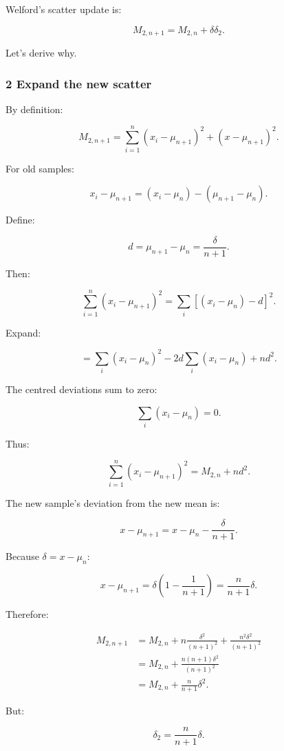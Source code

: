 Welford's scatter update is:

\[
 \boxed{ M_{2,n+1} = M_{2,n}+\delta\delta_2 }.
\]

Let's derive why.

\subsubsection{2 Expand the new scatter}\label{02-foundations-ii-ch030-expand-the-new-scatter}

\hypertarget{02-foundations-ii-ch030-expand-the-new-scatter}{}

By definition:

\[
 M_{2,n+1} = \sum_{i=1}^{n}(x_i-\mu_{n+1})^2 + (x-\mu_{n+1})^2.
\]

For old samples:

\[
 x_i-\mu_{n+1} = (x_i-\mu_n)-(\mu_{n+1}-\mu_n).
\]

Define:

\[
 d=\mu_{n+1}-\mu_n=\frac{\delta}{n+1}.
\]

Then:

\[
 \sum_{i=1}^{n}(x_i-\mu_{n+1})^2 = \sum_i[(x_i-\mu_n)-d]^2.
\]

Expand:

\[
 = \sum_i(x_i-\mu_n)^2 - 2d\sum_i(x_i-\mu_n) + nd^2.
\]

The centred deviations sum to zero:

\[
 \sum_i(x_i-\mu_n)=0.
\]

Thus:

\[
 \sum_{i=1}^{n}(x_i-\mu_{n+1})^2 = M_{2,n}+nd^2.
\]

The new sample's deviation from the new mean is:

\[
 x-\mu_{n+1} = x-\mu_n-\frac{\delta}{n+1}.
\]

Because \(\delta=x-\mu_n\):

\[
 x-\mu_{n+1} = \delta\left(1-\frac1{n+1}\right) = \frac{n}{n+1}\delta.
\]

Therefore:

\[
 \begin{aligned} M_{2,n+1} &= M_{2,n} +n\frac{\delta^2}{(n+1)^2} +\frac{n^2\delta^2}{(n+1)^2}\\ &= M_{2,n} +\frac{n(n+1)\delta^2}{(n+1)^2}\\ &= M_{2,n}+\frac{n}{n+1}\delta^2. \end{aligned}
\]

But:

\[
 \delta_2=\frac{n}{n+1}\delta.
\]

